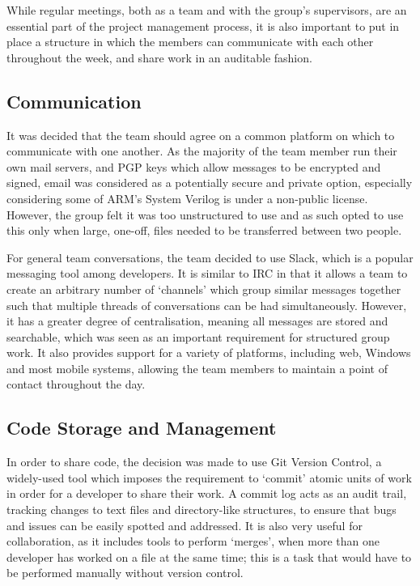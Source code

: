 
While regular meetings, both as a team and with the group's supervisors, are an essential part of the project management process, it is also important to put in place a structure in which the members can communicate with each other throughout the week, and share work in an auditable fashion.

\subsection{Communication}
It was decided that the team should agree on a common platform on which to communicate with one another. As the majority of the team member run their own mail servers, and PGP keys which allow messages to be encrypted and signed, email was considered as a potentially secure and private option, especially considering some of ARM's System Verilog is under a non-public license. However, the group felt it was too unstructured to use and as such opted to use this only when large, one-off, files needed to be transferred between two people.

For general team conversations, the team decided to use Slack, which is a popular messaging tool among developers. It is similar to IRC in that it allows a team to create an arbitrary number of `channels' which group similar messages together such that multiple threads of conversations can be had simultaneously. However, it has a greater degree of centralisation, meaning all messages are stored and searchable, which was seen as an important requirement for structured group work. It also provides support for a variety of platforms, including web, Windows and most mobile systems, allowing the team members to maintain a point of contact throughout the day.

\subsection{Code Storage and Management}
In order to share code, the decision was made to use Git Version Control, a widely-used tool which imposes the requirement to `commit' atomic units of work in order for a developer to share their work. A commit log acts as an audit trail, tracking changes to text files and directory-like structures, to ensure that bugs and issues can be easily spotted and addressed. It is also very useful for collaboration, as it includes tools to perform `merges', when more than one developer has worked on a file at the same time; this is a task that would have to be performed manually without version control.


